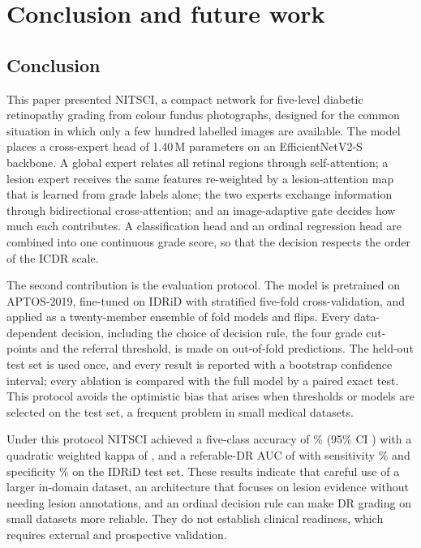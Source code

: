 \section{Conclusion and future work}\label{sec:conclusion}
\subsection{Conclusion}
This paper presented NITSCI, a compact network for five-level diabetic retinopathy grading from colour fundus
photographs, designed for the common situation in which only a few hundred labelled images are available. The model
places a cross-expert head of 1.40\,M parameters on an EfficientNetV2-S backbone. A global expert relates all retinal
regions through self-attention; a lesion expert receives the same features re-weighted by a lesion-attention map that
is learned from grade labels alone; the two experts exchange information through bidirectional cross-attention; and
an image-adaptive gate decides how much each contributes. A classification head and an ordinal regression head are
combined into one continuous grade score, so that the decision respects the order of the ICDR scale.

The second contribution is the evaluation protocol. The model is pretrained on APTOS-2019, fine-tuned on IDRiD with
stratified five-fold cross-validation, and applied as a twenty-member ensemble of fold models and flips. Every
data-dependent decision, including the choice of decision rule, the four grade cut-points and the referral threshold,
is made on out-of-fold predictions. The held-out test set is used once, and every result is reported with a bootstrap
confidence interval; every ablation is compared with the full model by a paired exact test. This protocol avoids the
optimistic bias that arises when thresholds or models are selected on the test set, a frequent problem in small
medical datasets.

Under this protocol NITSCI achieved a five-class accuracy of \% (95\% CI ) with a quadratic
weighted kappa of , and a referable-DR AUC of  with sensitivity \% and specificity
\% on the IDRiD test set.  These results indicate that careful use of a larger in-domain dataset, an
architecture that focuses on lesion evidence without needing lesion annotations, and an ordinal decision rule can
make DR grading on small datasets more reliable. They do not establish clinical readiness, which requires external
and prospective validation.

